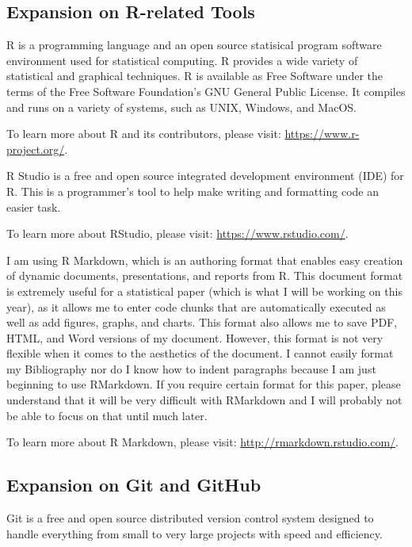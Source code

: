 \documentclass[12pt,twoside]{reedthesis}
\begin{document}
  \subsection{Expansion on R-related
  Tools}\label{expansion-on-r-related-tools}
  
  R is a programming language and an open source statisical program
  software environment used for statistical computing. R provides a wide
  variety of statistical and graphical techniques. R is available as Free
  Software under the terms of the Free Software Foundation's GNU General
  Public License. It compiles and runs on a variety of systems, such as
  UNIX, Windows, and MacOS.
  
  To learn more about R and its contributors, please visit:
  \url{https://www.r-project.org/}.
  
  R Studio is a free and open source integrated development environment
  (IDE) for R. This is a programmer's tool to help make writing and
  formatting code an easier task.
  
  To learn more about RStudio, please visit:
  \url{https://www.rstudio.com/}.
  
  I am using R Markdown, which is an authoring format that enables easy
  creation of dynamic documents, presentations, and reports from R. This
  document format is extremely useful for a statistical paper (which is
  what I will be working on this year), as it allows me to enter code
  chunks that are automatically executed as well as add figures, graphs,
  and charts. This format also allows me to save PDF, HTML, and Word
  versions of my document. However, this format is not very flexible when
  it comes to the aesthetics of the document. I cannot easily format my
  Bibliography nor do I know how to indent paragraphs because I am just
  beginning to use RMarkdown. If you require certain format for this
  paper, please understand that it will be very difficult with RMarkdown
  and I will probably not be able to focus on that until much later.
  
  To learn more about R Markdown, please visit:
  \url{http://rmarkdown.rstudio.com/}.
  
  \subsection{Expansion on Git and
  GitHub}\label{expansion-on-git-and-github}
  
  Git is a free and open source distributed version control system
  designed to handle everything from small to very large projects with
  speed and efficiency.
  
\end{document}
